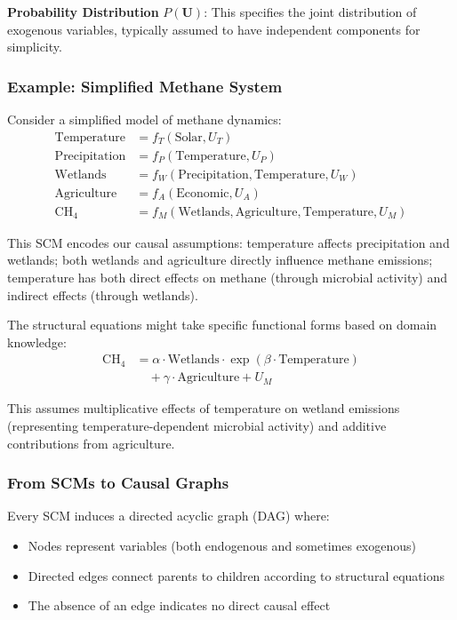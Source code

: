 \textbf{Probability Distribution} $P(\mathbf{U})$: This specifies the joint distribution of exogenous variables, typically assumed to have independent components for simplicity.

\subsubsection{Example: Simplified Methane System}

Consider a simplified model of methane dynamics:
\begin{align}
	\text{Temperature}   & = f_T(\text{Solar}, U_T)                                            \\
	\text{Precipitation} & = f_P(\text{Temperature}, U_P)                                      \\
	\text{Wetlands}      & = f_W(\text{Precipitation}, \text{Temperature}, U_W)                \\
	\text{Agriculture}   & = f_A(\text{Economic}, U_A)                                         \\
	\text{CH}_4          & = f_M(\text{Wetlands}, \text{Agriculture}, \text{Temperature}, U_M)
\end{align}

This SCM encodes our causal assumptions: temperature affects precipitation and wetlands; both wetlands and agriculture directly influence methane emissions; temperature has both direct effects on methane (through microbial activity) and indirect effects (through wetlands).

The structural equations might take specific functional forms based on domain knowledge:
\begin{align}
	\text{CH}_4 & = \alpha \cdot \text{Wetlands} \cdot \exp(\beta \cdot \text{Temperature}) \\
	            & \quad + \gamma \cdot \text{Agriculture} + U_M
\end{align}

This assumes multiplicative effects of temperature on wetland emissions (representing temperature-dependent microbial activity) and additive contributions from agriculture.

\subsubsection{From SCMs to Causal Graphs}

Every SCM induces a directed acyclic graph (DAG) where:
\begin{itemize}
	\item Nodes represent variables (both endogenous and sometimes exogenous)
	\item Directed edges connect parents to children according to structural equations
	\item The absence of an edge indicates no direct causal effect
\end{itemize}

